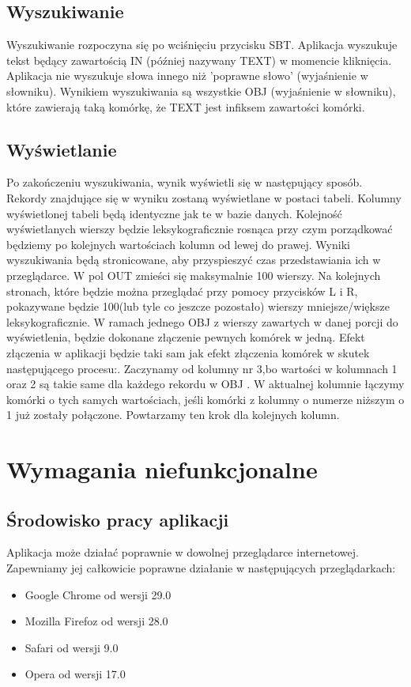 \documentclass[10pt, a4paper]{article}
\begin{document}
\subsection{Wyszukiwanie}
Wyszukiwanie rozpoczyna się po wciśnięciu przycisku SBT.
Aplikacja wyszukuje tekst będący zawartością IN (później nazywany TEXT) w momencie kliknięcia. \newline
Aplikacja nie wyszukuje słowa innego niż 'poprawne słowo' (wyjaśnienie w słowniku).\newline
Wynikiem wyszukiwania są wszystkie OBJ (wyjaśnienie w słowniku), które zawierają taką komórkę, że TEXT jest infiksem zawartości komórki.
\subsection{Wyświetlanie}
Po zakończeniu wyszukiwania, wynik wyświetli się w następujący sposób. \newline
Rekordy znajdujące się w wyniku zostaną wyświetlane w postaci tabeli. Kolumny wyświetlonej tabeli będą identyczne jak te w bazie danych. Kolejność wyświetlanych wierszy będzie leksykograficznie rosnąca przy czym porządkować będziemy po kolejnych wartościach kolumn od lewej do prawej. \newline
Wyniki wyszukiwania będą stronicowane, aby przyspieszyć czas przedstawiania ich w przeglądarce. W pol OUT zmieści się maksymalnie 100 wierszy. Na kolejnych stronach, które będzie można przeglądać przy pomocy przycisków L i R, pokazywane będzie 100(lub tyle co jeszcze pozostało) wierszy mniejsze/większe leksykograficznie.\newline 
W ramach jednego OBJ z wierszy zawartych w danej porcji do wyświetlenia, będzie dokonane złączenie pewnych komórek w jedną. Efekt złączenia w aplikacji będzie taki sam jak efekt złączenia komórek w skutek następującego procesu:. Zaczynamy od kolumny nr 3,bo wartości w kolumnach 1 oraz 2 są takie same dla każdego rekordu w OBJ . W aktualnej kolumnie łączymy komórki o tych samych wartościach, jeśli komórki z kolumny o numerze niższym o 1 już zostały połączone. Powtarzamy ten krok dla kolejnych kolumn.
\newline
\section{Wymagania niefunkcjonalne}
\subsection{Środowisko pracy aplikacji}
Aplikacja może działać poprawnie w dowolnej przeglądarce internetowej. Zapewniamy jej całkowicie poprawne działanie w następujących przeglądarkach:
\begin{itemize}
\item Google Chrome od wersji 29.0
\item Mozilla Firefoz od wersji 28.0
\item Safari od wersji 9.0
\item Opera od wersji 17.0
\end{itemize}
\end{document}
